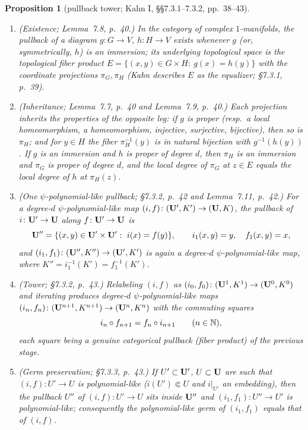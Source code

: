 \documentclass[11pt,reqno]{amsart}
\newtheorem{proposition}[theorem]{Proposition}
\theoremstyle{definition}
\theoremstyle{remark}
\begin{document}
\begin{proposition}[pullback tower; Kahn I, \S\S7.3.1--7.3.2, pp.~38--43]\label{prop:kahn-pullback-tower}
\begin{enumerate}
\item (Existence; Lemma~7.8, p.~40.)  In the category of complex
\(1\)-manifolds, the pullback of a diagram \(g\colon G\to V\),
\(h\colon H\to V\) exists whenever \(g\) (or, symmetrically, \(h\)) is
an immersion; its underlying topological space is the topological
fiber product
\(E=\{(x,y)\in G\times H:\ g(x)=h(y)\}\)
with the coordinate projections \(\pi_G,\pi_H\) (Kahn describes \(E\)
as the \emph{equalizer}; \S7.3.1, p.~39).
\item (Inheritance; Lemma~7.7, p.~40 and Lemma~7.9, p.~40.)  Each projection inherits
the properties of the opposite leg: if \(g\) is proper (resp.\ a local
homeomorphism, a homeomorphism, injective, surjective, bijective),
then so is \(\pi_H\); and for \(y\in H\) the fiber \(\pi_H^{-1}(y)\)
is in natural bijection with \(g^{-1}(h(y))\).  If \(g\) is an
immersion and \(h\) is proper of degree \(d\), then \(\pi_H\) is an
immersion and \(\pi_G\) is proper of degree \(d\), and the local
degree of \(\pi_G\) at \(z\in E\) equals the local degree of \(h\) at
\(\pi_H(z)\).
\item (One \(\psi\)-polynomial-like pullback; \S7.3.2, p.~42 and Lemma~7.11, p.~42.)  For a
degree-\(d\) \(\psi\)-polynomial-like map
\((i,f)\colon(\mathbf{U}',K')\to(\mathbf{U},K)\), the pullback of
\(i\colon\mathbf{U}'\to\mathbf{U}\) along \(f\colon\mathbf{U}'\to\mathbf{U}\) is
\[
 \BU''=\{(x,y)\in\BU'\times\BU':\ i(x)=f(y)\},\qquad
 i_1(x,y)=y,\quad f_1(x,y)=x,
\]
and \((i_1,f_1)\colon(\mathbf{U}'',K'')\to(\mathbf{U}',K')\) is again a
degree-\(d\) \(\psi\)-polynomial-like map, where
\(K''=i_1^{-1}(K')=f_1^{-1}(K')\).
\item (Tower; \S7.3.2, p.~43.)  Relabeling \((i,f)\) as
\((i_0,f_0)\colon(\mathbf{U}^1,K^1)\to(\mathbf{U}^0,K^0)\) and iterating produces
degree-\(d\) \(\psi\)-polynomial-like maps
\((i_n,f_n)\colon(\mathbf{U}^{n+1},K^{n+1})\to(\mathbf{U}^n,K^n)\) with the
commuting squares
\[
 i_n\circ f_{n+1}=f_n\circ i_{n+1}\qquad(n\in\mathbb{N}),
\]
each square being a genuine categorical pullback (fiber product) of
the previous stage.
\item (Germ preservation; \S7.3.3, p.~43.)  If \(U'\subset\mathbf{U}'\),
\(U\subset\mathbf{U}\) are such that \((i,f)\colon U'\to U\) is
polynomial-like (\(i(U')\Subset U\) and \(i|_{U'}\) an embedding),
then the pullback \(U''\) of \((i,f)\colon U'\to U\) sits inside
\(\mathbf{U}''\) and \((i_1,f_1)\colon U''\to U'\) is polynomial-like;
consequently the polynomial-like germ of \((i_1,f_1)\) equals that of
\((i,f)\).
\end{enumerate}
\end{proposition}
\end{document}
